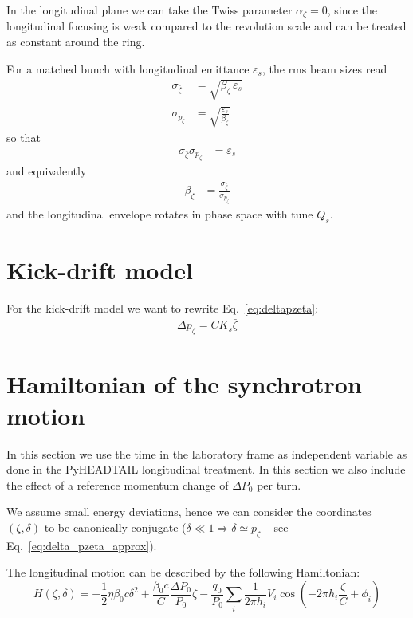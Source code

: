 In the longitudinal plane we can take the Twiss parameter $\alpha_\zeta = 0$, since the longitudinal focusing is weak compared to the revolution scale and can be treated as constant around the ring.

For a matched bunch with longitudinal emittance $\varepsilon_s$, the rms beam sizes read
\begin{align}
\sigma_{\bar{\zeta}} &= \sqrt{\beta_\zeta\,\varepsilon_s}\\
\sigma_{p_\zeta} &= \sqrt{\frac{\varepsilon_s}{\beta_\zeta}}
\end{align}
so that
\begin{align}
\sigma_{\bar{\zeta}}\sigma_{p_\zeta} &= \varepsilon_s
\label{eq:rms_emittance_relation}
\end{align}
and equivalently
\begin{align}
\beta_\zeta &= \frac{\sigma_{\bar{\zeta}}}{\sigma_{p_\zeta}}
\label{eq:beta_from_rms}
\end{align}
and the longitudinal envelope rotates in phase space with tune $Q_s$.

\section{Kick-drift model}
For the kick-drift model we want to rewrite Eq.~\ref{eq:deltapzeta}:
\begin{align}
\Delta {p}_\zeta = C K_s \bar{\zeta}
\end{align}

\section{Hamiltonian of the synchrotron motion}

In this section we use the time in the laboratory frame as independent variable as
done in the PyHEADTAIL longitudinal treatment. In this section we also include
the effect of a reference momentum change of $\Delta P_0$ per turn.

We assume small energy deviations, hence we can consider the coordinates
$(\zeta, \delta)$ to be canonically conjugate
($\delta \ll 1 \Rightarrow \delta \simeq p_\zeta$  -- see Eq.~\ref{eq:delta_pzeta_approx}).

The longitudinal motion can be described by the following Hamiltonian:
\begin{equation}
H(\zeta, \delta) = -\frac{1}{2} \eta \beta_0 c \delta^2
                   + \frac{\beta_0 c}{C}\frac{\Delta P_0}{P_0} \zeta
                   - \frac{q_0}{P_0}\sum_i \frac{1}{2\pi h_i}V_i \cos\left(
                   		-2 \pi h_i \frac{\zeta}{C} + \phi_i \right)
\end{equation}

